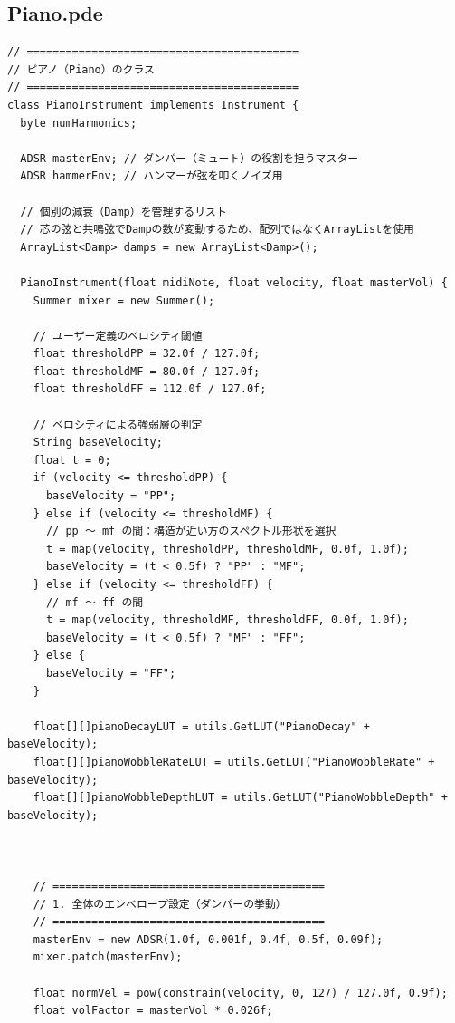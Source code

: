 \subsection{Piano.pde}
\begin{lstlisting}[caption={Piano.pde}, label={lst:proc_piano}]
// ==========================================
// ピアノ（Piano）のクラス
// ==========================================
class PianoInstrument implements Instrument {
  byte numHarmonics;
  
  ADSR masterEnv; // ダンパー（ミュート）の役割を担うマスター
  ADSR hammerEnv; // ハンマーが弦を叩くノイズ用
  
  // 個別の減衰（Damp）を管理するリスト
  // 芯の弦と共鳴弦でDampの数が変動するため、配列ではなくArrayListを使用
  ArrayList<Damp> damps = new ArrayList<Damp>();
  
  PianoInstrument(float midiNote, float velocity, float masterVol) {
    Summer mixer = new Summer();
    
    // ユーザー定義のベロシティ閾値
    float thresholdPP = 32.0f / 127.0f;
    float thresholdMF = 80.0f / 127.0f;
    float thresholdFF = 112.0f / 127.0f;
    
    // ベロシティによる強弱層の判定
    String baseVelocity;
    float t = 0;
    if (velocity <= thresholdPP) {
      baseVelocity = "PP";
    } else if (velocity <= thresholdMF) {
      // pp ～ mf の間：構造が近い方のスペクトル形状を選択
      t = map(velocity, thresholdPP, thresholdMF, 0.0f, 1.0f);
      baseVelocity = (t < 0.5f) ? "PP" : "MF";
    } else if (velocity <= thresholdFF) {
      // mf ～ ff の間
      t = map(velocity, thresholdMF, thresholdFF, 0.0f, 1.0f);
      baseVelocity = (t < 0.5f) ? "MF" : "FF";
    } else {
      baseVelocity = "FF";
    }
    
    float[][]pianoDecayLUT = utils.GetLUT("PianoDecay" + baseVelocity);
    float[][]pianoWobbleRateLUT = utils.GetLUT("PianoWobbleRate" + baseVelocity);
    float[][]pianoWobbleDepthLUT = utils.GetLUT("PianoWobbleDepth" + baseVelocity);
    
    
    
    // ==========================================
    // 1. 全体のエンベロープ設定（ダンパーの挙動）
    // ==========================================
    masterEnv = new ADSR(1.0f, 0.001f, 0.4f, 0.5f, 0.09f);
    mixer.patch(masterEnv); 
    
    float normVel = pow(constrain(velocity, 0, 127) / 127.0f, 0.9f);
    float volFactor = masterVol * 0.026f;
    

\end{lstlisting}
